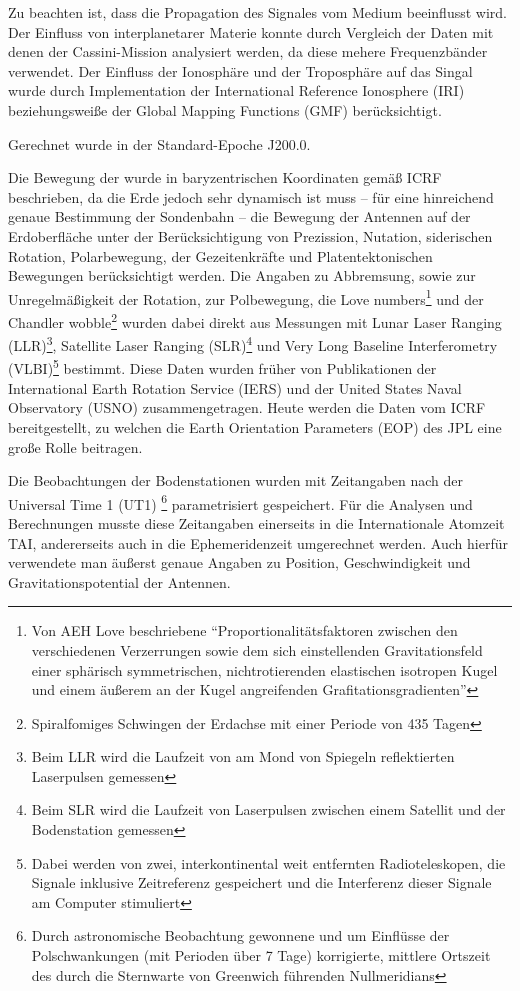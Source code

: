 Zu beachten ist, dass die Propagation des Signales vom Medium beeinflusst wird. Der Einfluss von interplanetarer Materie konnte durch Vergleich
der Daten mit denen der Cassini-Mission analysiert werden, da diese mehere Frequenzbänder verwendet.\cite{Dittus2006} %
Der Einfluss der Ionosphäre und der Troposphäre auf das Singal wurde durch Implementation der International Reference Ionosphere (IRI)
beziehungsweiße der Global Mapping Functions (GMF) berücksichtigt.\cite{Levy2008} %

Gerechnet wurde in der Standard-Epoche J200.0. %

Die Bewegung der wurde in baryzentrischen Koordinaten gemäß ICRF beschrieben, %
da die Erde jedoch sehr dynamisch ist muss – für eine hinreichend genaue Bestimmung der Sondenbahn –
die Bewegung der Antennen auf der Erdoberfläche unter der Berücksichtigung von Prezission, Nutation,
siderischen Rotation, Polarbewegung, der Gezeitenkräfte und Platentektonischen Bewegungen berücksichtigt werden.
Die Angaben zu Abbremsung, sowie zur Unregelmäßigkeit der Rotation, zur Polbewegung, die Love numbers\footnote{Von AEH Love beschriebene ``Proportionalitätsfaktoren zwischen den verschiedenen Verzerrungen sowie dem sich einstellenden Gravitationsfeld einer sphärisch symmetrischen, nichtrotierenden elastischen isotropen Kugel und einem äußerem an der Kugel angreifenden Grafitationsgradienten''\cite{Dittus2006}} und der Chandler wobble\footnote{Spiralfomiges Schwingen
der Erdachse mit einer Periode von 435 Tagen} %
wurden dabei direkt aus Messungen mit Lunar Laser Ranging (LLR)\footnote{Beim LLR wird die Laufzeit von am Mond von Spiegeln reflektierten Laserpulsen gemessen},
Satellite Laser Ranging (SLR)\footnote{Beim SLR wird die Laufzeit von Laserpulsen zwischen einem Satellit und der Bodenstation gemessen} und Very Long Baseline Interferometry
(VLBI)\footnote{Dabei werden von zwei, interkontinental weit entfernten Radioteleskopen, die Signale inklusive
Zeitreferenz gespeichert und die Interferenz dieser Signale am Computer stimuliert} bestimmt.
Diese Daten wurden früher von Publikationen der International Earth Rotation Service (IERS) und der United States Naval Observatory (USNO) zusammengetragen. Heute werden die Daten vom ICRF bereitgestellt, zu welchen die Earth Orientation Parameters
(EOP) des JPL eine große Rolle beitragen.\cite{Anderson2002}

Die Beobachtungen der Bodenstationen wurden mit Zeitangaben nach der Universal Time 1 (UT1)
\footnote{Durch astronomische Beobachtung gewonnene und um Einflüsse der Polschwankungen (mit Perioden über 7 Tage) korrigierte, mittlere Ortszeit des durch die Sternwarte von Greenwich führenden Nullmeridians}
parametrisiert gespeichert. Für die Analysen und
Berechnungen musste diese Zeitangaben einerseits in die Internationale Atomzeit TAI, andererseits auch in die
Ephemeridenzeit umgerechnet werden. Auch hierfür verwendete man äußerst genaue Angaben zu Position, Geschwindigkeit und
Gravitationspotential der Antennen.\cite{Dittus2006}

